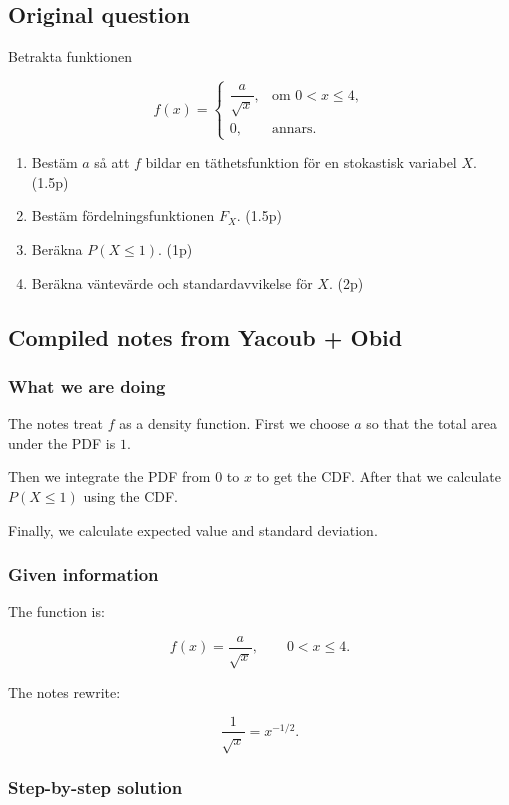\documentclass[10pt]{article}
\begin{document}
\subsection*{Original question}
Betrakta funktionen

\[
f(x)=
\begin{cases}
\dfrac{a}{\sqrt{x}},
& \text{om } 0<x\leq 4,\\
0,
& \text{annars.}
\end{cases}
\]

\begin{enumerate}[label=\alph*)]
\item
Bestäm $a$ så att $f$ bildar en täthetsfunktion för en stokastisk
variabel $X$.
\hfill (1.5p)

\item
Bestäm fördelningsfunktionen $F_X$.
\hfill (1.5p)

\item
Beräkna $P(X\leq 1)$.
\hfill (1p)

\item
Beräkna väntevärde och standardavvikelse för $X$.
\hfill (2p)
\end{enumerate}

\subsection*{Compiled notes from Yacoub + Obid}

\subsubsection*{What we are doing}
The notes treat $f$ as a density function.
First we choose $a$ so that the total area under the PDF is $1$.

Then we integrate the PDF from $0$ to $x$ to get the CDF.
After that we calculate $P(X\leq 1)$ using the CDF.

Finally, we calculate expected value and standard deviation.

\subsubsection*{Given information}
The function is:

\[
f(x)=
\frac{a}{\sqrt{x}},
\qquad 0<x\leq 4.
\]

The notes rewrite:

\[
\frac{1}{\sqrt{x}}=x^{-1/2}.
\]

\subsubsection*{Step-by-step solution}
\end{document}
